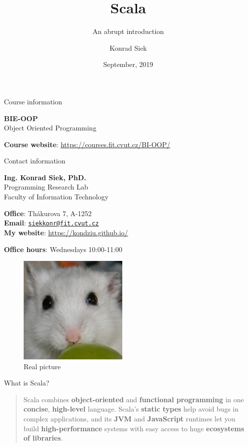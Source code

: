 \documentclass[ignorenonframetext,]{beamer}
\title{Scala}
\subtitle{An abrupt introduction}
\author{Konrad Siek}
\date{September, 2019}
\begin{document}
\frame{\titlepage}

\begin{frame}[fragile]

\begin{block}{Course information}

\textbf{BIE-OOP}\\
Object Oriented Programming

\textbf{Course website}: \url{https://courses.fit.cvut.cz/BI-OOP/}

\end{block}

\begin{block}{Contact information}

\textbf{Ing. Konrad Siek, PhD.}\\
Programming Research Lab\\
Faculty of Information Technology

\textbf{Office}: Thákurova 7, A-1252\\
\textbf{Email}:
\href{mailto:siekkonr@fit.cvut.cz}{\nolinkurl{siekkonr@fit.cvut.cz}}\\
\textbf{My website}: \url{https://kondziu.github.io/}

\textbf{Office hours}: Wednesdays 10:00-11:00

\begin{figure}
\centering
\includegraphics[height=2.08333in]{hamstur.png}
\caption{Real picture}
\end{figure}

\end{block}

\begin{block}{What is Scala?}

\begin{quote}
Scala combines \textbf{object-oriented} and \textbf{functional
programming} in one \textbf{concise}, \textbf{high-level} language.
Scala's \textbf{static types} help avoid bugs in complex applications,
and its \textbf{JVM} and \textbf{JavaScript} runtimes let you build
\textbf{high-performance} systems with easy access to huge
\textbf{ecosystems of libraries}.
\end{quote}


\end{block}
\end{frame}
\end{document}

